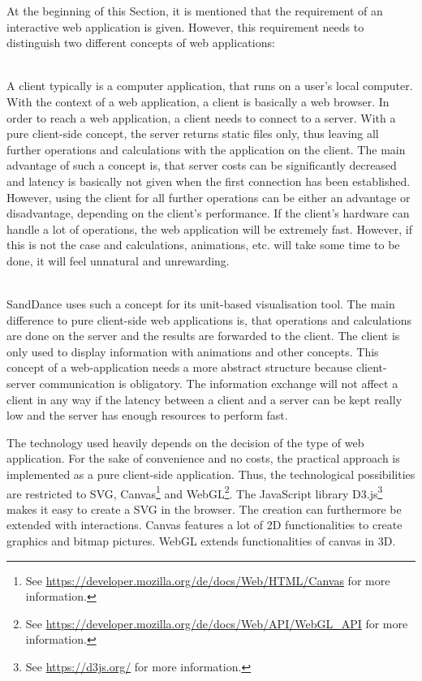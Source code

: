 At the beginning of this Section, it is mentioned that the requirement of an interactive web application is given. However, this requirement needs to distinguish two different concepts of web applications:

\begin{enumerate}

 \hfill \\
A client typically is a computer application, that runs on a user's local computer. With the context of a web application, a client is basically a web browser. In order to reach a web application, a client needs to connect to a server. With a pure client-side concept, the server returns static files only, thus leaving all further operations and calculations with the application on the client. The main advantage of such a concept is, that server costs can be significantly decreased and latency is basically not given when the first connection has been established. However, using the client for all further operations can be either an advantage or disadvantage, depending on the client's performance. If the client's hardware can handle a lot of operations, the web application will be extremely fast. However, if this is not the case and calculations, animations, etc. will take some time to be done, it will feel unnatural and unrewarding.

 \hfill \\
SandDance uses such a concept for its unit-based visualisation tool. The main difference to pure client-side web applications is, that operations and calculations are done on the server and the results are forwarded to the client. The client is only used to display information with animations and other concepts. This concept of a web-application needs a more abstract structure because client-server communication is obligatory. The information exchange will not affect a client in any way if the latency between a client and a server can be kept really low and the server has enough resources to perform fast.
\end{enumerate}

The technology used heavily depends on the decision of the type of web application. For the sake of convenience and no costs, the practical approach is implemented as a pure client-side application. Thus, the technological possibilities are restricted to \ac{SVG}, Canvas\footnote{See \href{https://developer.mozilla.org/de/docs/Web/HTML/Canvas}{https://developer.mozilla.org/de/docs/Web/HTML/Canvas} for more information.} and WebGL\footnote{See \href{https://developer.mozilla.org/de/docs/Web/API/WebGL_API}{https://developer.mozilla.org/de/docs/Web/API/WebGL\_API} for more information.}. The JavaScript library D3.js\footnote{See \href{https://d3js.org/}{https://d3js.org/} for more information.} makes it easy to create a \ac{SVG} in the browser. The creation can furthermore be extended with interactions. Canvas features a lot of 2D functionalities to create graphics and bitmap pictures. WebGL extends functionalities of canvas in 3D.
